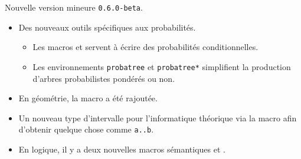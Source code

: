 Nouvelle version mineure \verb+0.6.0-beta+.

\begin{itemize}[itemsep=.5em]
    \item Des nouveaux outils spécifiques aux probabilités.
    \begin{itemize}[itemsep=.5em]
        \item Les macros  et  servent à écrire des probabilités conditionnelles.

        \item Les environnements \verb+probatree+ et \verb+probatree*+ simplifient la production d'arbres probabilistes pondérés ou non.
    \end{itemize}


    \item En géométrie, la macro  a été rajoutée.


    \item Un nouveau type d'intervalle pour l'informatique théorique via la macro  afin d'obtenir quelque chose comme \verb+a..b+.


    \item En logique, il y a deux nouvelles macros sémantiques  et .
\end{itemize}

